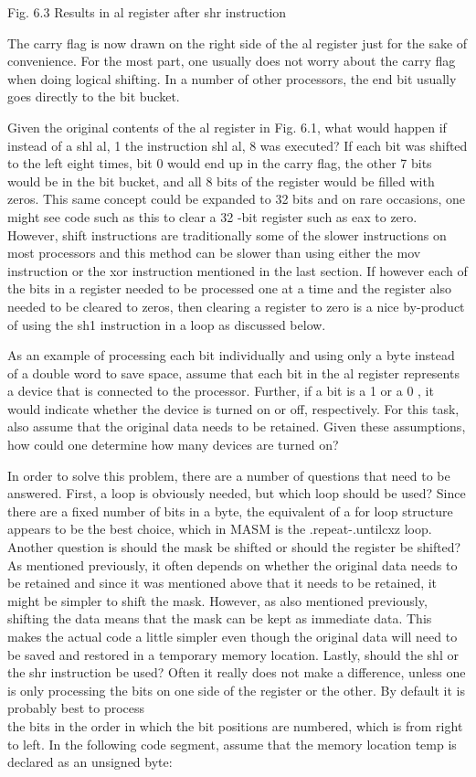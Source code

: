 \documentclass[10pt]{article}
\begin{document}
Fig. 6.3 Results in al register after shr instruction

The carry flag is now drawn on the right side of the al register just for the sake of convenience. For the most part, one usually does not worry about the carry flag when doing logical shifting. In a number of other processors, the end bit usually goes directly to the bit bucket.

Given the original contents of the al register in Fig. 6.1, what would happen if instead of a shl al, 1 the instruction shl al, 8 was executed? If each bit was shifted to the left eight times, bit 0 would end up in the carry flag, the other 7 bits would be in the bit bucket, and all 8 bits of the register would be filled with zeros. This same concept could be expanded to 32 bits and on rare occasions, one might see code such as this to clear a 32 -bit register such as eax to zero. However, shift instructions are traditionally some of the slower instructions on most processors and this method can be slower than using either the mov instruction or the xor instruction mentioned in the last section. If however each of the bits in a register needed to be processed one at a time and the register also needed to be cleared to zeros, then clearing a register to zero is a nice by-product of using the sh1 instruction in a loop as discussed below.

As an example of processing each bit individually and using only a byte instead of a double word to save space, assume that each bit in the al register represents a device that is connected to the processor. Further, if a bit is a 1 or a 0 , it would indicate whether the device is turned on or off, respectively. For this task, also assume that the original data needs to be retained. Given these assumptions, how could one determine how many devices are turned on?

In order to solve this problem, there are a number of questions that need to be answered. First, a loop is obviously needed, but which loop should be used? Since there are a fixed number of bits in a byte, the equivalent of a for loop structure appears to be the best choice, which in MASM is the .repeat-.untilcxz loop. Another question is should the mask be shifted or should the register be shifted? As mentioned previously, it often depends on whether the original data needs to be retained and since it was mentioned above that it needs to be retained, it might be simpler to shift the mask. However, as also mentioned previously, shifting the data means that the mask can be kept as immediate data. This makes the actual code a little simpler even though the original data will need to be saved and restored in a temporary memory location. Lastly, should the shl or the shr instruction be used? Often it really does not make a difference, unless one is only processing the bits on one side of the register or the other. By default it is probably best to process\\
the bits in the order in which the bit positions are numbered, which is from right to left. In the following code segment, assume that the memory location temp is declared as an unsigned byte:
\end{document}
